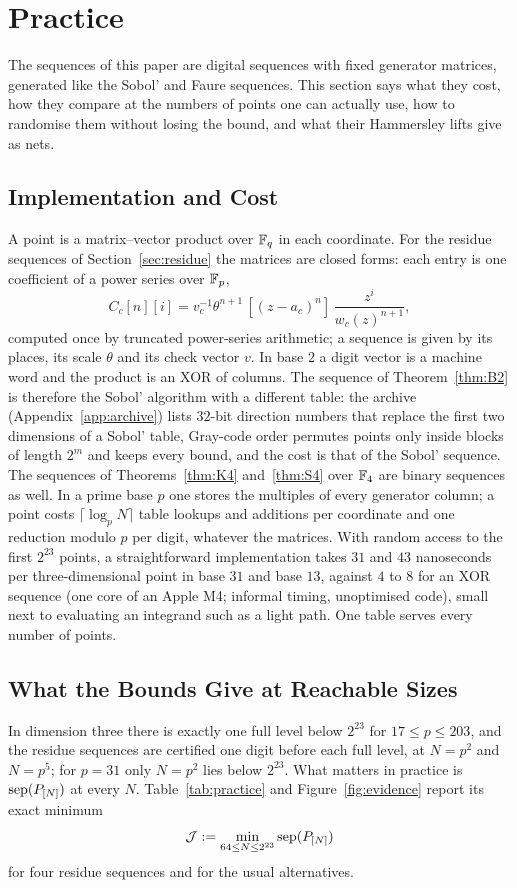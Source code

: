 %
%
%
%
%
%
%
%
\section{Practice}\label{sec:practice}
The sequences of this paper are digital sequences with fixed generator matrices, generated like the Sobol' and Faure sequences. This section says what they cost, how they compare at the numbers of points one can actually use, how to randomise them without losing the bound, and what their Hammersley lifts give as nets.

\subsection{Implementation and Cost}
A point is a matrix--vector product over $\mathbb{F}_q$ in each coordinate. For the residue sequences of Section~\ref{sec:residue} the matrices are closed forms: each entry is one coefficient of a power series over $\mathbb{F}_p$,
\[
C_c[n][i]=v_c^{-1}\theta^{n+1}\,[(z-a_c)^n]\,\frac{z^i}{w_c(z)^{n+1}},
\]
computed once by truncated power-series arithmetic; a sequence is given by its places, its scale $\theta$ and its check vector $v$. In base $2$ a digit vector is a machine word and the product is an XOR of columns. The sequence of Theorem~\ref{thm:B2} is therefore the Sobol' algorithm with a different table: the archive (Appendix~\ref{app:archive}) lists $32$-bit direction numbers that replace the first two dimensions of a Sobol' table, Gray-code order permutes points only inside blocks of length $2^m$ and keeps every bound, and the cost is that of the Sobol' sequence. The sequences of Theorems~\ref{thm:K4} and~\ref{thm:S4} over $\mathbb{F}_4$ are binary sequences as well. In a prime base $p$ one stores the multiples of every generator column; a point costs $\lceil\log_pN\rceil$ table lookups and additions per coordinate and one reduction modulo $p$ per digit, whatever the matrices. With random access to the first $2^{23}$ points, a straightforward implementation takes $31$ and $43$ nanoseconds per three-dimensional point in base $31$ and base $13$, against $4$ to $8$ for an XOR sequence (one core of an Apple M4; informal timing, unoptimised code), small next to evaluating an integrand such as a light path. One table serves every number of points.

\subsection{What the Bounds Give at Reachable Sizes}
In dimension three there is exactly one full level below $2^{23}$ for $17\le p\le203$, and the residue sequences are certified one digit before each full level, at $N=p^2$ and $N=p^5$; for $p=31$ only $N=p^2$ lies below $2^{23}$. What matters in practice is $\operatorname{sep}(P_{[N]})$ at every $N$. Table~\ref{tab:practice} and Figure~\ref{fig:evidence} report its exact minimum
\[
\mathcal J:=\min_{64\le N\le2^{23}}\operatorname{sep}(P_{[N]})
\]
for four residue sequences and for the usual alternatives.

